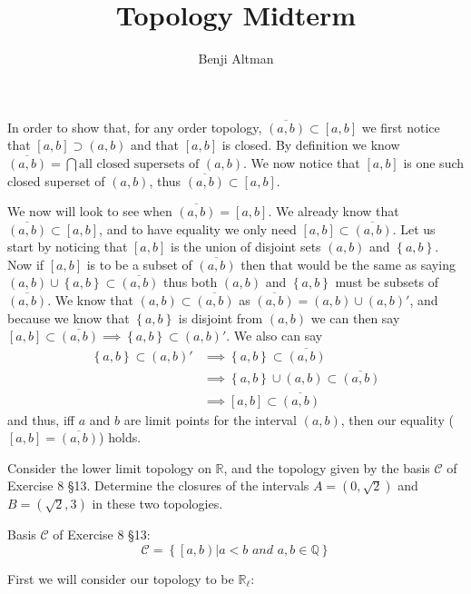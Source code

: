 \documentclass{article}
\title{Topology Midterm}
\author{Benji Altman}
\newcommand{\question}[1]{\marginpar{\flushright {#1}}}
\let\union\cup
\let\biginter\bigcap
\def\And{\textit{ and }}
\newcommand{\set}[1]{\left\{ {#1} \right\}}
\newcommand{\setbuilder}[2]{\set{#1 | #2}}
\newcommand{\closure}[1]{\overline{#1}}
\newcommand{\limpts}[1]{#1 '}
\newcommand{\ooint}[2]{\left( #1 , #2 \right)}
\newcommand{\coint}[2]{\left[ #1 , #2 \right)}
\newcommand{\ccint}[2]{\left[ #1 , #2 \right]}
\begin{document}
\maketitle

In \question{17.5} order to show that, for any order topology, $\closure{\ooint ab} \subset \ccint ab$ we first notice that $\ccint ab \supset \ooint ab$ and that $\ccint ab$ is closed. By definition we know $\closure{\ooint ab} = \biginter \text{all closed supersets of }\ooint ab$. We now notice that $\ccint ab$ is one such closed superset of $\ooint ab$, thus $\closure{\ooint ab} \subset \ccint ab$.

We now will look to see when $\closure{\ooint ab} = \ccint ab$. We already know that $\closure{\ooint ab} \subset \ccint ab$, and to have equality we only need $\ccint ab \subset \closure{\ooint ab}$. Let us start by noticing that $\ccint ab$ is the union of disjoint sets $\ooint ab$ and $\set{a,b}$. Now if $\ccint ab$ is to be a subset of $\closure{\ooint ab}$ then that would be the same as saying $\ooint ab\union\set{a,b}\subset\closure{\ooint ab}$ thus both $\ooint ab$ and $\set{a,b}$ must be subsets of $\closure{\ooint ab}$. We know that $\ooint ab\subset\closure{\ooint ab}$ as $\closure{\ooint ab} = \ooint ab \union \limpts{\ooint ab}$, and because we know that $\set{a,b}$ is disjoint from $\ooint ab$ we can then say $\ccint ab \subset \closure{\ooint ab} \implies \set{a,b} \subset \limpts{\ooint ab}$. We also can say
\begin{align*}
\set{a,b} \subset \limpts{\ooint ab} &\implies \set{a,b} \subset \closure{\ooint ab} \\
&\implies \set{a,b} \union \ooint ab \subset \closure{\ooint ab} \\
&\implies \ccint ab \subset \closure{\ooint ab}
\end{align*}
and thus, iff $a$ and $b$ are limit points for the interval $\ooint ab$, then our equality ($\ccint ab = \closure{\ooint ab}$) holds.
\bigskip

Consider\question{17.17} the lower limit topology on $\mathbb R$, and the topology given by the basis $\mathscr C$ of Exercise 8 \S 13. Determine the closures of the intervals $A = \ooint0{\sqrt{2}}$ and $B=\ooint{\sqrt2}3$ in these two topologies.

Basis $\mathscr C$ of Exercise 8 \S 13:\[\mathscr C = \setbuilder{\coint ab}{a<b \And a,b\in\mathbb Q}\]
\medskip

First we will consider our topology to be $\mathbb R_{\ell}$:
\smallskip
\end{document}
